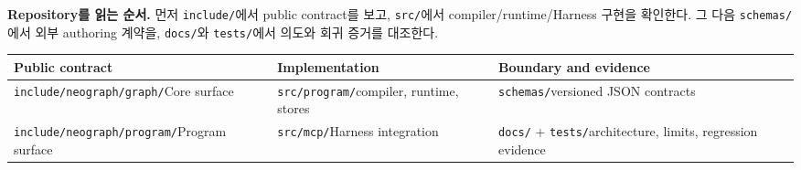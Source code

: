 \documentclass[a4paper,landscape]{article}
\begin{document}
\textbf{Repository를 읽는 순서.} 먼저 \texttt{include/}에서 public contract를 보고, \texttt{src/}에서 compiler/runtime/Harness 구현을 확인한다. 그 다음 \texttt{schemas/}에서 외부 authoring 계약을, \texttt{docs/}와 \texttt{tests/}에서 의도와 회귀 증거를 대조한다.

\begin{center}
\begin{tabular}{p{}p{}p{}}
\toprule
\textbf{Public contract} & \textbf{Implementation} & \textbf{Boundary and evidence} \\
\midrule
\texttt{include/neograph/graph/}\newline Core surface &
\texttt{src/program/}\newline compiler, runtime, stores &
\texttt{schemas/}\newline versioned JSON contracts \\
\texttt{include/neograph/program/}\newline Program surface &
\texttt{src/mcp/}\newline Harness integration &
\texttt{docs/} + \texttt{tests/}\newline architecture, limits, regression evidence \\
\bottomrule
\end{tabular}
\end{center}

\newpage
\end{document}
